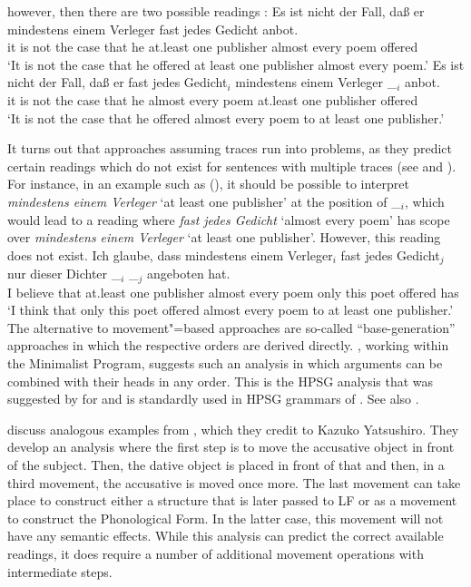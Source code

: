 \documentclass[output=paper
                ,modfonts
                ,nonflat
	        ,collection
	        ,collectionchapter
	        ,collectiontoclongg
 	        ,biblatex
                ,babelshorthands
                ,newtxmath
                ,draftmode
                ,colorlinks, citecolor=brown
]{./langsci/langscibook}
\begin{document}
however, then there are two possible readings \citep[]{Frey93a}:
\eal
\ex 
\gll Es ist nicht der Fall, daß er mindestens einem Verleger fast jedes Gedicht anbot.\\
     it is not the case that he at.least one publisher almost every poem offered\\
\glt `It is not the case that he offered at least one publisher almost every poem.'
\ex 
\gll Es ist nicht der Fall, daß er fast jedes Gedicht$_i$ mindestens einem Verleger \_$_i$ anbot.\\
	 it is not the case that he almost every poem at.least one publisher {} offered\\
\glt `It is not the case that he offered almost every poem to at least one publisher.'
\zl

\noindent
It turns out that approaches assuming traces run into problems, as they predict certain readings
which do not exist for\label{page-scrambling-scope}
sentences with multiple traces (see \citealp[]{Kiss2001a} and
\citealp[Section~2.6]{Fanselow2001a}). For instance, in an example such as (), it should be
possible to interpret \emph{mindestens einem Verleger} `at least one publisher' at the position of
\_$_i$, which would lead to a reading where \emph{fast jedes Gedicht} `almost every poem' has scope
over \emph{mindestens einem Verleger} `at least one publisher'. However, this reading does not exist.
\ea
\gll Ich glaube, dass mindestens einem Verleger$_i$ fast jedes Gedicht$_j$ nur dieser Dichter \_$_i$ \_$_j$ angeboten hat.\\
     I believe that at.least one publisher almost every poem only this poet {} {} offered has\\
\glt `I think that only this poet offered almost every poem to at least one publisher.'
\z
The alternative to movement"=based approaches are so-called ``base-generation'' approaches in which
the respective orders are derived directly. \citet{Fanselow2001a}, working within the Minimalist
Program, suggests such an analysis in which arguments can be combined with their heads in any
order. This is the HPSG analysis that was suggested by \citet{Gunji86a} for  and is
standardly used in HPSG grammars of 
\citep{HN94a,Kiss95a,Meurers99a,Mueller2003a,MuellerGS}. See also .

\citet[]{SE2002a} discuss analogous examples from , which they credit to
Kazuko Yatsushiro. They develop an analysis where the first step is to move
the accusative object in front of the subject. Then, the dative object is placed in front of that
and then, in a third movement, the accusative is moved once more. The last movement can take place
to construct either a structure that is later passed to LF or as a movement to construct the
Phonological Form. In the latter case, this movement will not have any semantic effects. While this
analysis can predict the correct available readings, it does require a number of additional movement
operations with intermediate steps.%
\end{document}
